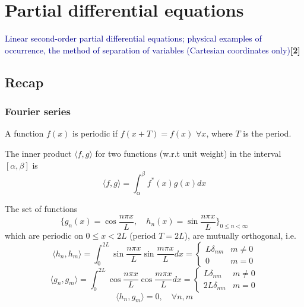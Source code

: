 \documentclass[a4paper]{article}
\begin{document}
\section{Partial differential equations}
{\small\textcolor{darkblue}{Linear second-order partial differential equations; physical examples of occurrence, the method of separation of variables (Cartesian coordinates only)}\hfill\textbf{[2]}}
\subsection{Recap}
\subsubsection*{Fourier series}
\begin{defi}
A function $f(x)$ is periodic if $f(x+T)=f(x)$ $\forall x$, where $T$ is the period.
\end{defi}
\begin{defi}
The inner product $\langle f,g\rangle$ for two functions (w.r.t unit weight) in the interval $[\alpha,\beta]$ is
$$\langle f,g\rangle=\int_\alpha^\beta f^*(x)g(x)dx$$
\end{defi}
\begin{prop}
The set of functions 
$$\bigg\{g_n(x)=\cos\frac{n\pi x}{L},\quad h_n(x)=\sin\frac{n\pi x}{L}\bigg\}_{0\leq n<\infty}$$
which are periodic on $0\leq x<2L$ (period $T=2L$), are mutually orthogonal, i.e.
\begin{equation}
   \langle h_n,h_m\rangle=\int_0^{2L}\sin\frac{n\pi x}{L}\sin\frac{m\pi x}{L}dx=
\left\{
        \begin{array}{ll}
      L\delta_{nm} & m\neq0\\
      0 & m=0
        \end{array}
    \right.\tag{2.1} 
\end{equation}
\begin{equation}
    \langle g_n,g_m\rangle=\int_0^{2L}\cos\frac{n\pi x}{L}\cos\frac{m\pi x}{L}dx=
\left\{
        \begin{array}{ll}
      L\delta_{nm} & m\neq0\\
      2L\delta_{nm} & m=0
        \end{array}
    \right.\tag{2.2}
\end{equation}
\begin{equation}
    \langle h_n,g_m\rangle=0,\quad \forall n,m\tag{2.3}
\end{equation}
\end{prop}
\end{document}
